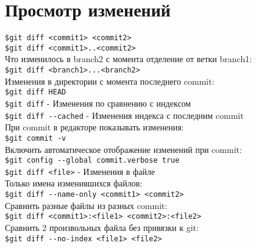 \section{Просмотр изменений}

\noindent \texttt{\$git diff <commit1> <commit2>} \\
\noindent \texttt{\$git diff <commit1>..<commit2>} \\

\noindent Что изменилось в branch2 с момента отделение от ветки branch1: \\
\indent \texttt{\$git diff <branch1>...<branch2>} \\
\noindent Изменения в директории с момента последнего commit: \\
\indent \texttt{\$git diff HEAD} \\
\noindent \texttt{\$git diff} - Изменения по сравнению с индексом \\
\noindent \texttt{\$git diff {-}-cached} - Изменения индекса с последним commit \\

\noindent При commit в редакторе показывать изменения: \\
\indent \texttt{\$git commit -v} \\
\noindent Включить автоматическое отображение изменений при commit: \\
\indent \texttt{\$git config {-}-global commit.verbose true} \\

\noindent \texttt{\$git diff <file>} - Изменения в файле \\
\noindent Только имена изменившихся файлов: \\
\indent \texttt{\$git diff {-}-name-only <commit1> <commit2>}\\
\noindent Сравнить разные файлы из разных commit: \\
\indent \texttt{\$git diff <commit1>:<file1> <commit2>:<file2>} \\
\noindent Сравнить 2 произвольных файла без привязки к git: \\
\indent \texttt{\$git diff {-}-no-index <file1> <file2>} \\
